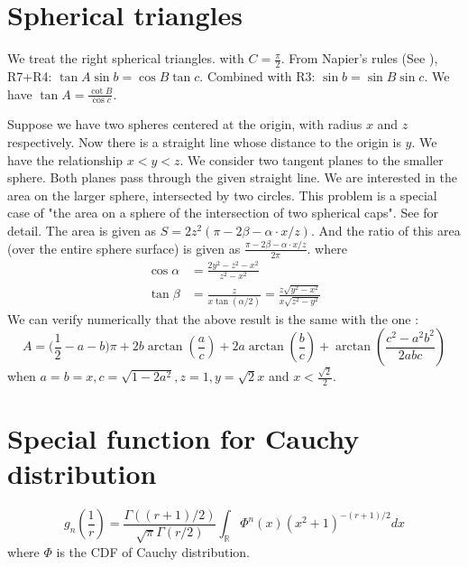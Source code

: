 \documentclass{article}
\begin{document}
\section{Spherical triangles}
We treat the  right spherical triangles. with $C=\frac{\pi}{2}$.
From Napier's rules
(See \cite{Napier}),
R7+R4: $\tan A \sin b = \cos B \tan c$.
Combined with R3: $\sin b = \sin B \sin c$.
We have $\tan A = \frac{\cot B}{\cos c}$.

Suppose we have two spheres centered at the origin, with radius $x$ and $z$ respectively.
Now there is a straight line whose distance to the origin is $y$.
We have the relationship $x<y<z$.
We consider two tangent planes to the smaller sphere.
Both planes pass through the given straight line.
We are interested in the area
on the larger sphere,
intersected by two circles.
This problem is a special case
of "the area on a sphere of the intersection of two spherical caps".
See \cite{intersection}
for detail.
The area is given as $S=2z^2(\pi - 2\beta - \alpha \cdot x/z)$.
And the ratio of this area (over the entire sphere surface)
is given as
$\frac{\pi - 2\beta - \alpha \cdot x/z}{2\pi}$.
where
\begin{align}
\cos \alpha & = \frac{2y^2 - z^2 - x^2}{
    z^2 - x^2 }\\
\tan \beta &= \frac{z}{ 
    x  \tan(\alpha/2)} = \frac{z \sqrt{y^2-x^2}}{x\sqrt{z^2-y^2}}
\end{align}
We can verify numerically that the above result is the same with 
the one \cite{orthogonal}:
\begin{equation}
    A=\big(\frac 12-a-b\big)\pi + 2b\arctan(\frac ac)+2a\arctan(\frac bc)+\arctan(\frac{c^2-a^2 b^2}{2abc})
\end{equation}
when $a=b=x, c=\sqrt{1-2a^2}, z=1,y=\sqrt{2}x$ and $x<\frac{\sqrt{2}}{2}$.
\section{Special function for Cauchy distribution}
\begin{equation}
    g_n(\frac{1}{r}) = \frac{\Gamma((r+1)/2)}{\sqrt{\pi} \Gamma(r/2)}
    \int_{\mathbb{R}} \Phi^n(x)(x^2+1)^{-(r+1)/2}dx
\end{equation}
where $\Phi$ is the CDF of Cauchy distribution.


\end{document}
